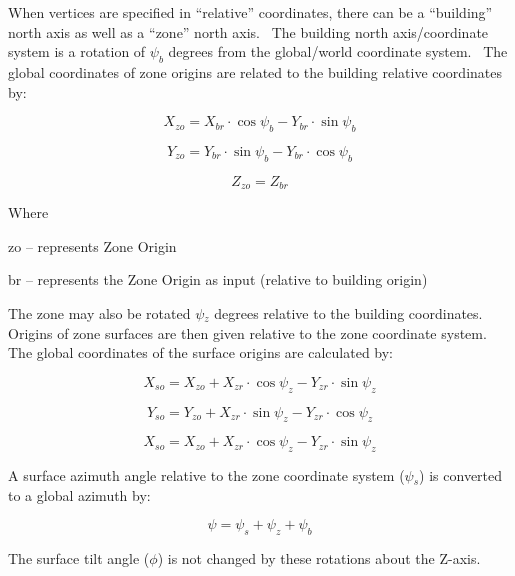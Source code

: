 When vertices are specified in ``relative'' coordinates, there can be a ``building'' north axis as well as a ``zone'' north axis.~ The building north axis/coordinate system is a rotation of $\psi_b$ degrees from the global/world coordinate system.~ The global coordinates of zone origins are related to the building relative coordinates by:

\begin{equation}
{X_{zo}} = {X_{br}}\cdot \cos {\psi_b} - {Y_{br}}\cdot \sin {\psi_b}
\end{equation}

\begin{equation}
{Y_{zo}} = {Y_{br}}\cdot \sin {\psi_b} - {Y_{br}}\cdot \cos {\psi_b}
\end{equation}

\begin{equation}
{Z_{zo}} = {Z_{br}}
\end{equation}

Where

zo -- represents Zone Origin

br -- represents the Zone Origin as input (relative to building origin)

The zone may also be rotated $\psi$\(_{z}\) degrees relative to the building coordinates. Origins of zone surfaces are then given relative to the zone coordinate system. The global coordinates of the surface origins are calculated by:

\begin{equation}
{X_{so}} = {X_{zo}} + {X_{zr}}\cdot \cos {\psi_z} - {Y_{zr}}\cdot \sin {\psi_z}
\end{equation}

\begin{equation}
{Y_{so}} = {Y_{zo}} + {X_{zr}}\cdot \sin {\psi_z} - {Y_{zr}}\cdot \cos {\psi_z}
\end{equation}

\begin{equation}
{X_{so}} = {X_{zo}} + {X_{zr}}\cdot \cos {\psi_z} - {Y_{zr}}\cdot \sin {\psi_z}
\end{equation}

A surface azimuth angle relative to the zone coordinate system ($\psi$\(_{s}\)) is converted to a global azimuth by:

\begin{equation}
\psi  = {\psi_s} + {\psi_z} + {\psi_b}
\end{equation}

The surface tilt angle ($\phi$) is not changed by these rotations about the Z-axis.

